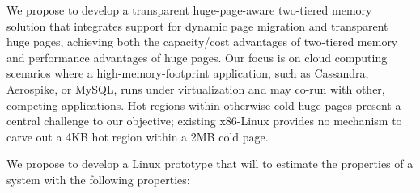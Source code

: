 We propose to develop a transparent huge-page-aware two-tiered memory solution
that integrates support for dynamic page migration and transparent huge pages,
achieving both the capacity/cost advantages of two-tiered memory and performance
advantages of huge pages.  Our focus is on cloud computing scenarios where a
high-memory-footprint application, such as Cassandra, Aerospike, or MySQL, runs
under virtualization and may co-run with other, competing applications.  Hot
regions within otherwise cold huge pages present a central challenge to our
objective; existing x86-Linux provides no mechanism to carve out a 4KB hot
region within a 2MB cold page.


We propose to develop a Linux prototype that will to estimate the properties of
a system with the following properties:


